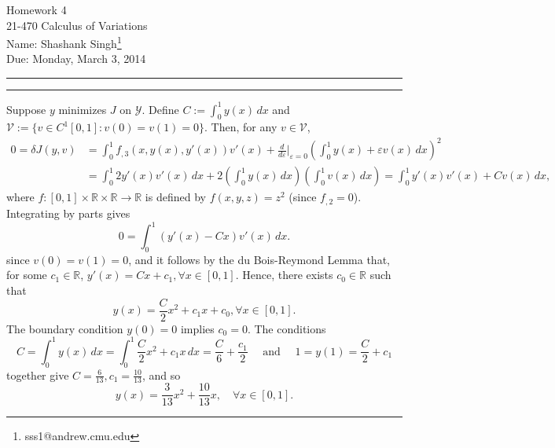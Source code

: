 \documentclass[11pt]{article}
\makeatletter
\newcounter{questionCounter}
\newcounter{partCounter}[questionCounter]
\newenvironment{question}[2][\arabic{questionCounter}]{%
    \setcounter{partCounter}{0}%
    \vspace{.25in} \hrule \vspace{0.5em}%
        \noindent{\bf #2}%
    \vspace{0.8em} \hrule \vspace{.10in}%
    \addtocounter{questionCounter}{1}%
}{}
\newcommand{\myname}{Shashank Singh\footnote{sss1@andrew.cmu.edu}}
\newcommand{\myclass}{21-470 Calculus of Variations}
\newcommand{\myhwnum}{4}
\newcommand{\duedate}{Monday, March 3, 2014}
\newcommand{\R}{\mathbb{R}}             %
\newcommand{\e}{\varepsilon}            %
\newcommand{\Y}{\mathscr{Y}}            %
\newcommand{\V}{\mathscr{V}}            %
\makeatother
\begin{document}
\thispagestyle{plain}

{\Large Homework \myhwnum} \\
\myclass \\
Name: \myname \\
Due: \duedate

\begin{question}{Problem 1}
Suppose $y$ minimizes $J$ on $\Y$. Define $C := \int_0^1 y(x) \, dx$ and
$\V := \{v \in C^1[0,1] : v(0) = v(1) = 0\}$. Then, for any $v \in \V$,
\begin{align*}
0
    = \delta J(y,v)
 &  = \int_0^1 f_{,3}(x,y(x),y'(x))v'(x) + \frac{d}{d\e} \bigg|_{\e = 0}
                            \left( \int_0^1 y(x) + \e v(x) \, dx\right)^2    \\
 &  = \int_0^1 2y'(x)v'(x) \, dx
    + 2 \left( \int_0^1 y(x) \, dx \right)\left( \int_0^1 v(x) \, dx \right)
    = \int_0^1 y'(x)v'(x) + Cv(x) \, dx,
\end{align*}
where $f : [0,1] \times \R \times \R \to \R$ is defined by $f(x,y,z) = z^2$
(since $f_{,2} = 0$). Integrating by parts gives
\[0 = \int_0^1 (y'(x) - Cx) v'(x) \, dx.\]
since $v(0) = v(1) = 0$, and it follows by the du Bois-Reymond Lemma that, for
some $c_1 \in \R$, $y'(x) = Cx + c_1, \forall x \in [0,1]$.
Hence, there exists $c_0 \in \R$ such that
\[y(x) = \frac{C}{2} x^2 + c_1 x + c_0, \forall x \in [0,1].\] The boundary
condition $y(0) = 0$ implies $c_0 = 0$. The conditions
\[C
    = \int_0^1 y(x) \, dx
    = \int_0^1 \frac{C}{2} x^2 + c_1 x \, dx
    = \frac{C}{6} + \frac{c_1}{2}
\quad \mbox{ and } \quad
1
    = y(1)
    = \frac{C}{2} + c_1
\]
together give $C = \frac{6}{13}, c_1 = \frac{10}{13}$, and so
\[y(x) = \frac{3}{13} x^2 + \frac{10}{13} x, \quad \forall x \in [0,1].\]
\end{question}
\end{document}
